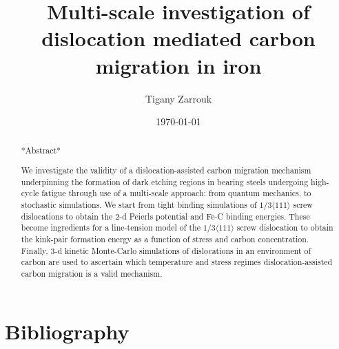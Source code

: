 \documentclass[a4paper]{apa6}
\affiliation{King's College London}
\author{Tigany Zarrouk}
\date{\today}
\title{Multi-scale investigation of dislocation mediated carbon migration in iron}
\begin{document}
\maketitle
\tableofcontents

\begin{abstract}

*Abstract*

We investigate the validity of a dislocation-assisted carbon migration
mechanism underpinning the formation of dark etching regions in
bearing steels undergoing high-cycle fatigue through use of a
multi-scale approach: from quantum mechanics,
to stochastic simulations. We start from tight binding simulations of
$1/3\langle 111 \rangle$ screw dislocations to obtain the 2-d Peierls
potential and Fe-C binding energies. These become ingredients for a line-tension
model of the $1/3\langle 111 \rangle$ screw dislocation to obtain the kink-pair formation
energy as a function of stress and carbon concentration. Finally,
3-d kinetic Monte-Carlo simulations of dislocations in an environment
of carbon are used to ascertain which temperature and stress regimes
dislocation-assisted carbon migration is a valid mechanism. 

\end{abstract}


\section{Bibliography}
\label{sec:org71f8d7f}
\label{orgc6ff880}



\end{document}

